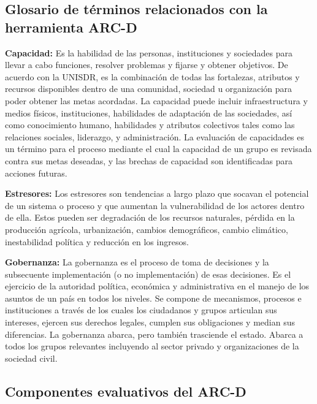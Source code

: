 \documentclass[
  letterpaper,
]{book}
\begin{document}
\begin{tcolorbox}
\subsection{Glosario de términos relacionados con la herramienta
ARC-D}\label{glosario-de-tuxe9rminos-relacionados-con-la-herramienta-arc-d}

\textbf{Capacidad:} Es la habilidad de las personas, instituciones y
sociedades para llevar a cabo funciones, resolver problemas y fijarse y
obtener objetivos. De acuerdo con la UNISDR, es la combinación de todas
las fortalezas, atributos y recursos disponibles dentro de una
comunidad, sociedad u organización para poder obtener las metas
acordadas. La capacidad puede incluir infraestructura y medios físicos,
instituciones, habilidades de adaptación de las sociedades, así como
conocimiento humano, habilidades y atributos colectivos tales como las
relaciones sociales, liderazgo, y administración. La evaluación de
capacidades es un término para el proceso mediante el cual la capacidad
de un grupo es revisada contra sus metas deseadas, y las brechas de
capacidad son identificadas para acciones futuras.

\textbf{Estresores:} Los estresores son tendencias a largo plazo que
socavan el potencial de un sistema o proceso y que aumentan la
vulnerabilidad de los actores dentro de ella. Estos pueden ser
degradación de los recursos naturales, pérdida en la producción
agrícola, urbanización, cambios demográficos, cambio climático,
inestabilidad política y reducción en los ingresos.

\textbf{Gobernanza:} La gobernanza es el proceso de toma de decisiones y
la subsecuente implementación (o no implementación) de esas decisiones.
Es el ejercicio de la autoridad política, económica y administrativa en
el manejo de los asuntos de un país en todos los niveles. Se compone de
mecanismos, procesos e instituciones a través de los cuales los
ciudadanos y grupos articulan sus intereses, ejercen sus derechos
legales, cumplen sus obligaciones y median sus diferencias. La
gobernanza abarca, pero también trasciende el estado. Abarca a todos los
grupos relevantes incluyendo al sector privado y organizaciones de la
sociedad civil.

\end{tcolorbox}

\subsection{Componentes evaluativos del
ARC-D}\label{componentes-evaluativos-del-arc-d}
\end{document}
